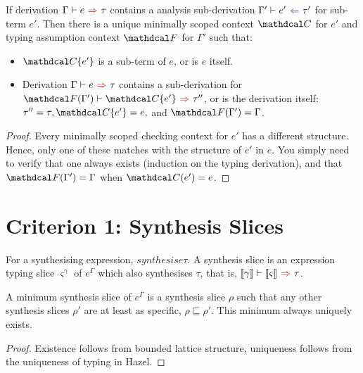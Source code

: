 \begin{proposition}
\label{def:CheckingContextInProgram}
If derivation $\synthesis{e}{\tau}$ contains a analysis sub-derivation $\analysis[\Gamma']{e'}{\tau'}$ for sub-term $e'$. Then there is a unique minimally scoped context $\C$ for $e'$ and typing assumption context $\F$ for $\Gamma'$ such that:
\begin{itemize}
\item $\C\{e'\}$ is a sub-term of $e$, or is $e$ itself.
\item Derivation $\synthesis{e}{\tau}$ contains a sub-derivation for $\synthesis[\F(\Gamma')]{\C\{e'\}}{\tau''}$, or is the derivation itself: $\tau'' = \tau, \C\{e'\} = e,$ and $\F(\Gamma') = \Gamma$.
\end{itemize}
\end{proposition}
\begin{proof}
Every minimally scoped checking context for $e'$ has a different structure. Hence, only one of these matches with the structure of $e'$ in $e$. You simply need to verify that one always exists (induction on the typing derivation), and that $\F(\Gamma') = \Gamma$ when $\C(e') = e$.
\end{proof}

\section{Criterion 1: Synthesis Slices}
\label{sec:SynthesisSlicesJudgement}
\begin{definition}
For a synthesising expression, $synthesis{e}{\tau}$. A synthesis slice is an expression typing slice $\varsigma^{\gamma}$ of $e^\Gamma$ which also synthesises $\tau$, that is, $\synthesis[\type{\gamma}]{\type{\varsigma}}{\tau}$.
\end{definition}
\begin{proposition}
A minimum synthesis slice of $e^\Gamma$ is a synthesis slice $\rho$ such that any other synthesis slices $\rho'$ are at least as specific, $\rho \sqsubseteq \rho'$. This minimum always uniquely exists.
\end{proposition}
\begin{proof}
Existence follows from bounded lattice structure, uniqueness follows from the uniqueness of typing in Hazel.
\end{proof}

